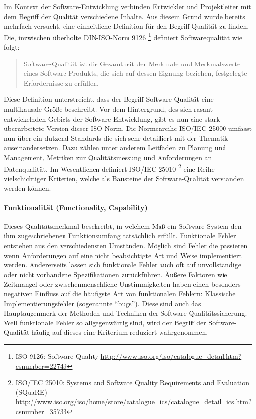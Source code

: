 Im Kontext der Software-Entwicklung verbinden Entwickler und Projektleiter mit dem Begriff der Qualität verschiedene Inhalte.\cite{hoffmann_software-qualitat_2013} Aus diesem Grund wurde bereits mehrfach versucht, eine einheitliche Definition für den Begriff Qualität zu finden. Die, inzwischen überholte DIN-ISO-Norm 9126 \footnote{ISO 9126: Software Quality \url{http://www.iso.org/iso/catalogue_detail.htm?csnumber=22749}} definiert Softwarequalität wie folgt:

\begin{quote}
Software-Qualität ist die Gesamtheit der Merkmale und Merkmalswerte eines Software-Produkts, die sich auf dessen Eignung beziehen, festgelegte Erfordernisse zu erfüllen.
\end{quote}

Diese Definition unterstreicht, dass der Begriff Software-Qualität eine multikausale Größe beschreibt.\cite{hoffmann_software-qualitat_2013} Vor dem Hintergrund, des sich rasant entwickelnden Gebiets der Software-Entwicklung, gibt es nun eine stark überarbeitete Version dieser ISO-Norm. Die Normenreihe ISO/IEC 25000 umfasst nun über ein dutzend Standards die sich sehr detailliert mit der Thematik auseinandersetzen. Dazu zählen unter anderem Leitfäden zu Planung und Management, Metriken zur Qualitätsmessung und Anforderungen an Datenqualität. Im Wesentlichen definiert ISO/IEC 25010 \footnote{ISO/IEC 25010: Systems and Software Quality Requirements and Evaluation (SQuaRE) \url{http://www.iso.org/iso/home/store/catalogue_ics/catalogue_detail_ics.htm?csnumber=35733}} eine Reihe vielschichtiger Kriterien, welche als Bausteine der Software-Qualität verstanden werden können.

\paragraph{Funktionalität (Functionality, Capability)} Dieses Qualitätsmerkmal beschreibt, in welchem Maß ein Software-System den ihm zugeschriebenen Funktionsumfang tatsächlich erfüllt. Funktionale Fehler entstehen aus den verschiedensten Umständen. Möglich sind Fehler die passieren wenn Anforderungen auf eine nicht beabsichtigte Art und Weise implementiert werden. Andererseits lassen sich funktionale Fehler auch oft auf unvollständige oder nicht vorhandene Spezifikationen zurückführen. Äußere Faktoren wie Zeitmangel oder zwischenmenschliche Unstimmigkeiten haben einen besonders negativen Einfluss auf die häufigste Art von funktionalen Fehlern: Klassische Implementierungsfehler (sogenannte ``bugs''). Diese sind auch das Hauptaugenmerk der Methoden und Techniken der Software-Qualitätssicherung. Weil funktionale Fehler so allgegenwärtig sind, wird der Begriff der Software-Qualität häufig auf dieses eine Kriterium reduziert wahrgenommen.

